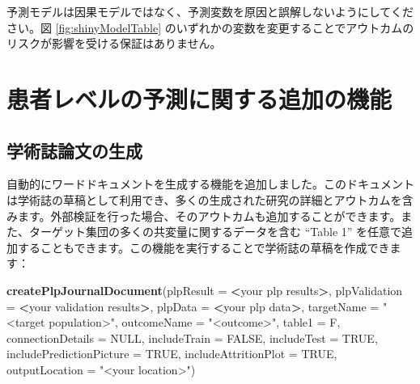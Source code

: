 \documentclass[
  11pt]{book}
\makeatletter
\newenvironment{Shaded}{\begin{snugshade}}{\end{snugshade}}
\newcommand{\AttributeTok}[1]{\textcolor[rgb]{0.13,0.29,0.53}{#1}}
\newcommand{\ConstantTok}[1]{\textcolor[rgb]{0.56,0.35,0.01}{#1}}
\newcommand{\FunctionTok}[1]{\textcolor[rgb]{0.13,0.29,0.53}{\textbf{#1}}}
\newcommand{\NormalTok}[1]{#1}
\newcommand{\SpecialCharTok}[1]{\textcolor[rgb]{0.81,0.36,0.00}{\textbf{#1}}}
\newcommand{\StringTok}[1]{\textcolor[rgb]{0.31,0.60,0.02}{#1}}
\newenvironment{kframe}{%
\medskip{}
\setlength{\fboxsep}{.8em}
 \def\at@end@of@kframe{}%
 \ifinner\ifhmode%
  \def\at@end@of@kframe{\end{minipage}}%
  \begin{minipage}{\columnwidth}%
 \fi\fi%
 \def\FrameCommand##1{\hskip\@totalleftmargin \hskip-\fboxsep
 \colorbox{myShadeColor}{##1}\hskip-\fboxsep
     \hskip-\linewidth \hskip-\@totalleftmargin \hskip\columnwidth}%
 \MakeFramed {\advance\hsize-\width
   \@totalleftmargin\z@ \linewidth\hsize
   \@setminipage}}%
 {\par\unskip\endMakeFramed%
 \at@end@of@kframe}
\newenvironment{rmdblock}[1]
  {
  \begin{itemize}
  \renewcommand{\labelitemi}{
    \raisebox{-.7\height}[0pt][0pt]{
      {\setkeys{Gin}{width=3em,keepaspectratio}\texttt{[image: images/\#1]}}
    }
  }
  \setlength{\fboxsep}{1em}
  \begin{kframe}
  \item
  }
  {
  \end{kframe}
  \end{itemize}
  }
\newenvironment{rmdimportant}
  {\begin{rmdblock}{important}}
  {\end{rmdblock}}
\theoremstyle{definition}
\theoremstyle{definition}
\theoremstyle{definition}
\theoremstyle{definition}
\theoremstyle{remark}
\makeatother
\begin{document}
\begin{rmdimportant}
予測モデルは因果モデルではなく、予測変数を原因と誤解しないようにしてください。図 \ref{fig:shinyModelTable} のいずれかの変数を変更することでアウトカムのリスクが影響を受ける保証はありません。
\end{rmdimportant}

\section{患者レベルの予測に関する追加の機能}\label{ux60a3ux8005ux30ecux30d9ux30ebux306eux4e88ux6e2cux306bux95a2ux3059ux308bux8ffdux52a0ux306eux6a5fux80fd}

\subsection{学術誌論文の生成}\label{ux5b66ux8853ux8a8cux8ad6ux6587ux306eux751fux6210}

自動的にワードドキュメントを生成する機能を追加しました。このドキュメントは学術誌の草稿として利用でき、多くの生成された研究の詳細とアウトカムを含みます。外部検証を行った場合、そのアウトカムも追加することができます。また、ターゲット集団の多くの共変量に関するデータを含む ``Table 1'' を任意で追加することもできます。この機能を実行することで学術誌の草稿を作成できます：

\begin{Shaded}
\begin{Highlighting}[]
 \FunctionTok{createPlpJournalDocument}\NormalTok{(}\AttributeTok{plpResult =} \SpecialCharTok{\textless{}}\NormalTok{your plp results}\SpecialCharTok{\textgreater{}}\NormalTok{,}
             \AttributeTok{plpValidation =} \SpecialCharTok{\textless{}}\NormalTok{your validation results}\SpecialCharTok{\textgreater{}}\NormalTok{,}
             \AttributeTok{plpData =} \SpecialCharTok{\textless{}}\NormalTok{your plp data}\SpecialCharTok{\textgreater{}}\NormalTok{,}
             \AttributeTok{targetName =} \StringTok{"\textless{}target population\textgreater{}"}\NormalTok{,}
             \AttributeTok{outcomeName =} \StringTok{"\textless{}outcome\textgreater{}"}\NormalTok{,}
             \AttributeTok{table1 =}\NormalTok{ F,}
             \AttributeTok{connectionDetails =} \ConstantTok{NULL}\NormalTok{,}
             \AttributeTok{includeTrain =} \ConstantTok{FALSE}\NormalTok{,}
             \AttributeTok{includeTest =} \ConstantTok{TRUE}\NormalTok{,}
             \AttributeTok{includePredictionPicture =} \ConstantTok{TRUE}\NormalTok{,}
             \AttributeTok{includeAttritionPlot =} \ConstantTok{TRUE}\NormalTok{,}
             \AttributeTok{outputLocation =} \StringTok{"\textless{}your location\textgreater{}"}\NormalTok{)}
\end{Highlighting}
\end{Shaded}
\end{document}
